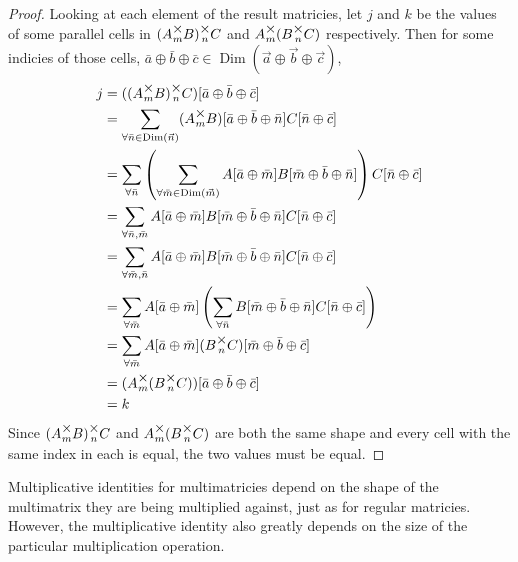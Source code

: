 \documentclass[12pt]{article}
\theoremstyle{definition}
\theoremstyle{plain}
\theoremstyle{ppart}
\DeclareMathOperator{\Dim}{Dim}
\newcommand{\mmult}[1]{\text{\raisebox{1ex}{$\underset{#1}{\times}$}}}
\begin{document}
\begin{proof}
Looking at each element of the result matricies, let $j$ and $k$ be the values
of some parallel cells in $(A \mmult{m} B) \mmult{n} C$ and
$A \mmult{m} (B \mmult{n} C)$ respectively. Then for some indicies of those cells,
$\bar{a} \oplus \bar{b} \oplus \bar{c} \in
\Dim(\vec{a} \oplus \vec{b} \oplus \vec{c})$,
\begin{align*}
 j
 &= ((A \mmult{m} B) \mmult{n} C)[\bar{a} \oplus \bar{b} \oplus \bar{c}] \\
 &= \sum_{\forall \bar{n} \in \Dim(\vec{n})}
 (A \mmult{m} B)[\bar{a} \oplus \bar{b} \oplus \bar{n}]
 C[\bar{n} \oplus \bar{c}] \\
 &= \sum_{\forall \bar{n}}
 \left(
  \sum_{\forall \bar{m} \in \Dim(\vec{m})}
  A[\bar{a} \oplus \bar{m}]B[\bar{m} \oplus \bar{b} \oplus \bar{n}]
 \right)
 C[\bar{n} \oplus \bar{c}] \\
 &= \sum_{\forall \bar{n}, \bar{m}}
 A[\bar{a} \oplus \bar{m}]
 B[\bar{m} \oplus \bar{b} \oplus \bar{n}]
 C[\bar{n} \oplus \bar{c}] \\
 &= \sum_{\forall \bar{m}, \bar{n}}
 A[\bar{a} \oplus \bar{m}]
 B[\bar{m} \oplus \bar{b} \oplus \bar{n}]
 C[\bar{n} \oplus \bar{c}] \\
 &= \sum_{\forall \bar{m}}
 A[\bar{a} \oplus \bar{m}]
 \left(
 \sum_{\forall \bar{n}}
  B[\bar{m} \oplus \bar{b} \oplus \bar{n}]
  C[\bar{n} \oplus \bar{c}]
 \right) \\
 &= \sum_{\forall \bar{m}}
 A[\bar{a} \oplus \bar{m}]
 (B \mmult{n} C)[\bar{m} \oplus \bar{b} \oplus \bar{c}] \\
 &= (A \mmult{m} (B \mmult{n} C))[\bar{a} \oplus \bar{b} \oplus \bar{c}] \\
 &= k
\end{align*}
Since $(A \mmult{m} B) \mmult{n} C$ and $A \mmult{m} (B \mmult{n} C)$ are both
the same shape and every cell with the same index in each is equal, the two
values must be equal.
\end{proof}

Multiplicative identities for multimatricies depend on the shape of the
multimatrix they are being multiplied against, just as for regular matricies.
However, the multiplicative identity also greatly depends on the size of
the particular multiplication operation. 
\end{document}
